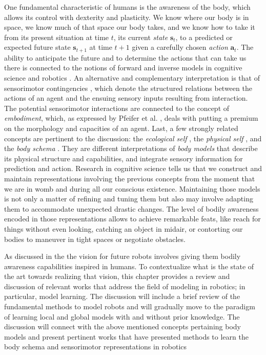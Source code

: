 One fundamental characteristic of humans is the awareness of the body, which allows its control with dexterity and plasticity. We know where our body is in space, we know much of that space our body takes, and we know how to take it from its present situation at time $t$, its current \textit{state} $\bm{s}_t$, to a predicted or expected future state $\bm{s}_{t+1}$ at time $t+1$ given a carefully chosen \textit{action} $\bm{a}_t$. The ability to anticipate the future and to determine the actions that can take us there is connected to the notions of forward and inverse models in cognitive science and robotics \cite{Kawato1999Internalmodelsmotor,Pierella2019dynamicsmotorlearning,NguyenTuong2011Modellearningrobot}. An alternative and complementary interpretation is that of sensorimotor contingencies \cite{Maye2013Extendingsensorimotorcontingency,Jacquey2019Sensorimotorcontingenciesas,Buhrmann2013dynamicalsystemsaccount}, which denote the structured relations between the actions of an agent and the ensuing sensory inputs resulting from interaction. The potential sensorimotor interactions are connected to the concept of \textit{embodiment}, which, as expressed by Pfeifer et al. \cite{Pfeifer2006Howbodyshapes}, deals with  putting a premium on the morphology and capacities of an agent. Last, a few strongly related concepts are pertinent to the discussion: the \textit{ecological self} , the \textit{physical self} , and the \textit{body schema} . They are different interpretations of \textit{body models} that describe its physical structure and capabilities, and integrate sensory information for prediction and action. Research in cognitive science tells us that we construct and maintain representations involving the previous concepts from the moment that we are in womb and during all our conscious existence. Maintaining those models is not only a matter of refining and tuning them but also may involve adapting them to accommodate unexpected drastic changes. The level of bodily awareness encoded in those representations allows to achieve remarkable feats, like reach for things without even looking, catching an object in midair, or contorting our bodies to maneuver in tight spaces or negotiate obstacles.

As discussed in the  the vision for future robots involves giving them bodily awareness capabilities inspired in humans. To contextualize what is the state of the art towards realizing that vision, this chapter provides a review and discussion of relevant works that address the field of modeling in robotics; in particular, model learning. The discussion will include a brief review of the fundamental methods to model robots and will gradually move to the paradigm of learning local and global models with and without prior knowledge. The discussion will connect with the above mentioned concepts pertaining body models and present pertinent works that have presented methods to learn the body schema and sensorimotor representations in robotics

